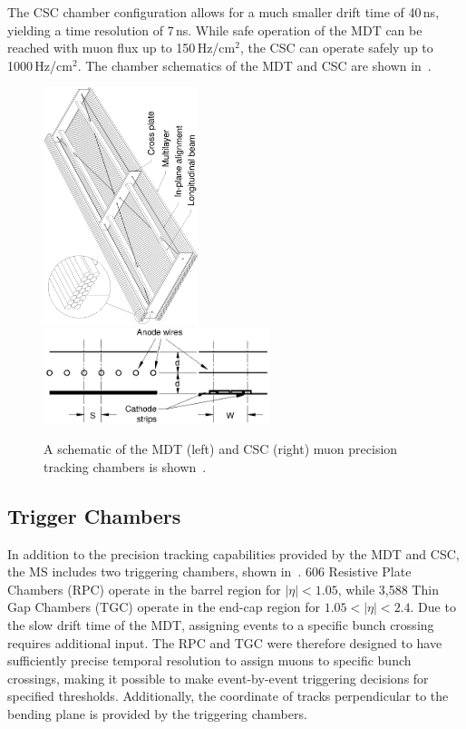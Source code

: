The CSC chamber configuration allows for a much smaller drift time of 40\,ns, yielding a time resolution of 7\,ns.  While safe operation of the MDT can be reached with muon flux up to 150\,Hz/cm$^2$, the CSC can operate safely up to 1000\,Hz/cm$^2$. The chamber schematics of the MDT and CSC are shown in~\Fig{\ref{fig:muon_tracking}}.


\begin{figure}[htbp]
\begin{center}
\includegraphics[angle=-90,origin=c,width=0.4\textwidth]{figures/Atlas/MDTchamber}
\includegraphics[width=0.59\textwidth]{figures/Atlas/CSC}
\end{center}
\caption[Schematic of muon precision tracking chambers]{A schematic of the MDT (left) and CSC (right) muon precision tracking chambers is shown~\cite{Muon_TDR}.}
\label{fig:muon_tracking}
\end{figure}

%
\subsection{Trigger Chambers}
In addition to the precision tracking capabilities provided by the MDT and CSC, the MS includes two triggering chambers, shown in~\Fig{\ref{fig:muon_trigger}}. 606 Resistive Plate Chambers (RPC) operate in the barrel region for $|\eta|<1.05$, while 3,588 Thin Gap Chambers (TGC) operate in the end-cap region for $1.05<|\eta|<2.4$. Due to the slow drift time of the MDT, assigning events to a specific bunch crossing requires additional input. The RPC and TGC were therefore designed to have sufficiently precise temporal resolution to assign muons to specific bunch crossings, making it possible to make event-by-event triggering decisions for specified \pt thresholds. Additionally, the coordinate of tracks perpendicular to the bending plane is provided by the triggering chambers.

